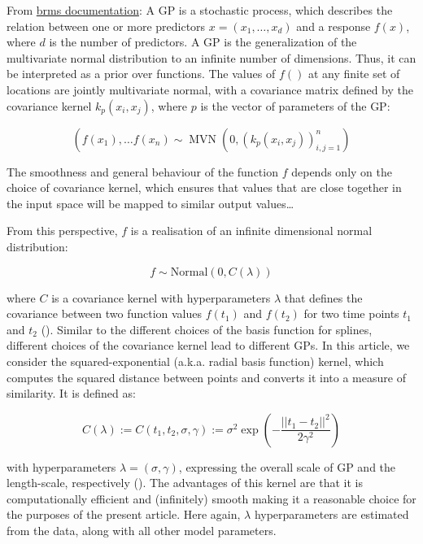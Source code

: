 \documentclass[
  doc,
  floatsintext,
  longtable,
  a4paper,
  nolmodern,
  notxfonts,
  notimes,
  colorlinks=true,linkcolor=blue,citecolor=blue,urlcolor=blue]{apa7}
\begin{document}
From
\href{https://www.rdocumentation.org/packages/brms/versions/2.22.0/topics/gp}{brms
documentation}: A GP is a stochastic process, which describes the
relation between one or more predictors
\(x=\left(x_{1}, \ldots, x_{d}\right)\) and a response \(f(x)\), where
\(d\) is the number of predictors. A GP is the generalization of the
multivariate normal distribution to an infinite number of dimensions.
Thus, it can be interpreted as a prior over functions. The values of
\(f()\) at any finite set of locations are jointly multivariate normal,
with a covariance matrix defined by the covariance kernel
\(k_p\left(x_i, x_j\right)\), where \(p\) is the vector of parameters of
the GP:

\[
\left(f\left(x_{1}\right), \ldots f\left(x_{n}\right) \sim \operatorname{MVN}\left(0, \left(k_p\left(x_{i}, x_{j}\right)\right)_{i, j=1}^{n}\right)\right.
\]

The smoothness and general behaviour of the function \(f\) depends only
on the choice of covariance kernel, which ensures that values that are
close together in the input space will be mapped to similar output
values\ldots{}

From this perspective, \(f\) is a realisation of an infinite dimensional
normal distribution:

\[
f \sim \mathrm{Normal}(0, C(\lambda))
\]

where \(C\) is a covariance kernel with hyperparameters \(\lambda\) that
defines the covariance between two function values \(f\left(t_1\right)\)
and \(f\left(t_2\right)\) for two time points \(t_1\) and \(t_2\)
(). Similar to
the different choices of the basis function for splines, different
choices of the covariance kernel lead to different GPs. In this article,
we consider the squared-exponential (a.k.a. radial basis function)
kernel, which computes the squared distance between points and converts
it into a measure of similarity. It is defined as:

\[
C(\lambda) := C\left(t_1, t_2, \sigma, \gamma\right) := \sigma^2 \exp \left(-\frac{||t_1-t_2||^{2}}{2 \gamma^2}\right)
\]

with hyperparameters \(\lambda = (\sigma, \gamma)\), expressing the
overall scale of GP and the length-scale, respectively
(). The
advantages of this kernel are that it is computationally efficient and
(infinitely) smooth making it a reasonable choice for the purposes of
the present article. Here again, \(\lambda\) hyperparameters are
estimated from the data, along with all other model parameters.
\end{document}
